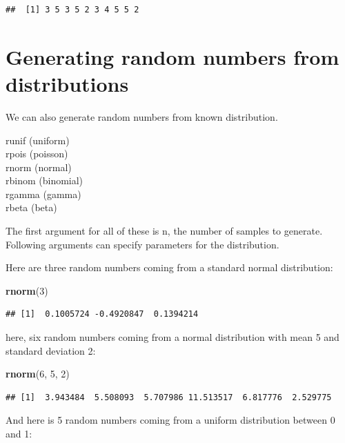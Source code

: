 \documentclass[]{book}
\newenvironment{Shaded}{\begin{snugshade}}{\end{snugshade}}
\newcommand{\DecValTok}[1]{\textcolor[rgb]{0.00,0.00,0.81}{#1}}
\newcommand{\KeywordTok}[1]{\textcolor[rgb]{0.13,0.29,0.53}{\textbf{#1}}}
\newcommand{\NormalTok}[1]{#1}
\begin{document}
\begin{verbatim}
##  [1] 3 5 3 5 2 3 4 5 5 2
\end{verbatim}

\hypertarget{generating-random-numbers-from-distributions}{%
\section{Generating random numbers from distributions}\label{generating-random-numbers-from-distributions}}

We can also generate random numbers from known distribution.

runif (uniform)\\
rpois (poisson)\\
rnorm (normal)\\
rbinom (binomial)\\
rgamma (gamma)\\
rbeta (beta)

The first argument for all of these is n, the number of samples to generate. Following arguments can specify parameters for the distribution.

Here are three random numbers coming from a standard normal distribution:

\begin{Shaded}
\begin{Highlighting}[]
\KeywordTok{rnorm}\NormalTok{(}\DecValTok{3}\NormalTok{)}
\end{Highlighting}
\end{Shaded}

\begin{verbatim}
## [1]  0.1005724 -0.4920847  0.1394214
\end{verbatim}

here, six random numbers coming from a normal distribution with mean 5 and standard deviation 2:

\begin{Shaded}
\begin{Highlighting}[]
\KeywordTok{rnorm}\NormalTok{(}\DecValTok{6}\NormalTok{, }\DecValTok{5}\NormalTok{, }\DecValTok{2}\NormalTok{)}
\end{Highlighting}
\end{Shaded}

\begin{verbatim}
## [1]  3.943484  5.508093  5.707986 11.513517  6.817776  2.529775
\end{verbatim}

And here is 5 random numbers coming from a uniform distribution between 0 and 1:
\end{document}
